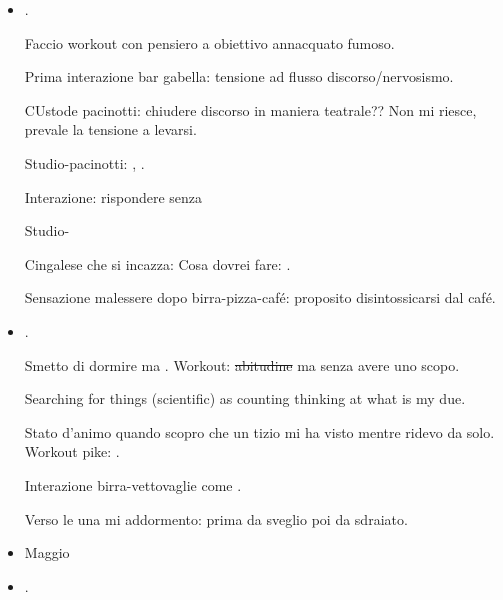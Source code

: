 \begin{itemize}
Pranzo  con Simone che ti guarda mentre bevi; euforia alle casse della PAM messa in crisi dalla commessa che ti evita.

Non riesco a pensare all'opportunit\'a di conseguire un obiettivo: .

Telefono padre: a cena, dolce ciao, ''hai i mezzi per comprendere'': non riesco a controllarmi perch\'e sono  (vedi nino mentre pensavo che fosse a budapest).


\item {}.

Faccio workout con pensiero a obiettivo annacquato fumoso.

Prima interazione bar gabella: tensione ad  flusso discorso/nervosismo.

CUstode pacinotti: chiudere discorso in maniera teatrale?? Non mi riesce, prevale la tensione a levarsi. 

Studio-pacinotti: , .

Interazione: rispondere senza 

Studio-

Cingalese che si incazza: Cosa dovrei fare: .

Sensazione malessere dopo birra-pizza-caf\'e: proposito disintossicarsi dal caf\'e.

\item {}.

Smetto di dormire ma . Workout: \sout{abitudine} ma senza avere uno scopo.

Searching for things (scientific) as counting thinking at what is my due.

Stato d'animo quando scopro che un tizio mi ha visto mentre ridevo da solo.
Workout pike: .

Interazione birra-vettovaglie come .

Verso le una mi addormento: prima da sveglio poi da sdraiato.


\item Maggio

\item {}.


\end{itemize}
